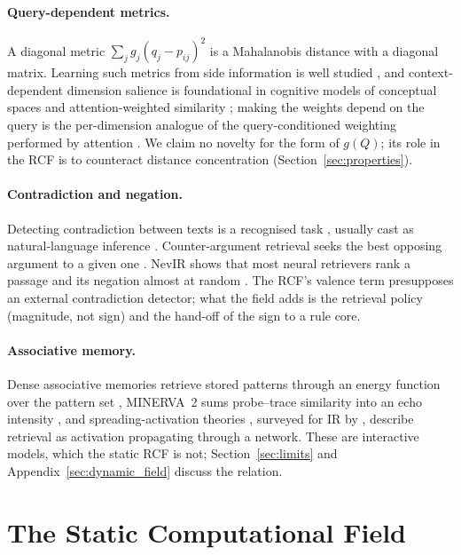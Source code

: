 \documentclass[11pt]{article}
\theoremstyle{remark}
\begin{document}
\paragraph{Query-dependent metrics.}
A diagonal metric $\sum_j g_j (q_j-p_{ij})^2$ is a Mahalanobis distance with a diagonal matrix. Learning such metrics from side information is well studied \citep{xing2003distance,goldberger2005nca,weinberger2009lmnn}, and context-dependent dimension salience is foundational in cognitive models of conceptual spaces and attention-weighted similarity \citep{nosofsky1986attention,shepard1987universal,gardenfors2000conceptual}; making the weights depend on the query is the per-dimension analogue of the query-conditioned weighting performed by attention \citep{vaswani2017attention}. We claim no novelty for the form of $g(Q)$; its role in the RCF is to counteract distance concentration (Section~\ref{sec:properties}).

\paragraph{Contradiction and negation.}
Detecting contradiction between texts is a recognised task \citep{demarneffe2008finding}, usually cast as natural-language inference \citep{williams2018mnli}. Counter-argument retrieval seeks the best opposing argument to a given one \citep{wachsmuth2018retrieval}. NevIR shows that most neural retrievers rank a passage and its negation almost at random \citep{weller2024nevir}. The RCF's valence term presupposes an external contradiction detector; what the field adds is the retrieval policy (magnitude, not sign) and the hand-off of the sign to a rule core.

\paragraph{Associative memory.}
Dense associative memories retrieve stored patterns through an energy function over the pattern set \citep{krotov2016dense,ramsauer2021hopfield}, MINERVA~2 sums probe--trace similarity into an echo intensity \citep{hintzman1984minerva,hintzman1986schema}, and spreading-activation theories \citep{collins1975spreading}, surveyed for IR by \citet{crestani1997spreading}, describe retrieval as activation propagating through a network. These are interactive models, which the static RCF is not; Section~\ref{sec:limits} and Appendix~\ref{sec:dynamic_field} discuss the relation.

\section{The Static Computational Field}
\label{sec:model}
\end{document}

